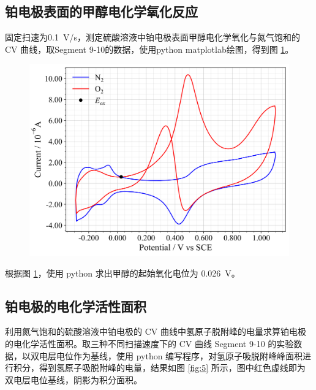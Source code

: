\subsection{铂电极表面的甲醇电化学氧化反应}

固定扫速为\SI{0.1}{V/s}，测定硫酸溶液中铂电极表面甲醇电化学氧化与氮气饱和的 CV 曲线，取Segment 9-10的数据，使用python matplotlab绘图，得到图 \ref{fig:4}。

\begin{figure}[htbp]
    \centering
    \includegraphics[width=.75\textwidth]{figures2/4.png}
    \label{fig:4}
\end{figure}

根据图 \ref{fig:4}，使用 python 求出甲醇的起始氧化电位为 \SI{0.026}{V}。

\subsection{铂电极的电化学活性面积}

利用氮气饱和的硫酸溶液中铂电极的 $\mathrm{CV}$ 曲线中氢原子脱附峰的电量求算铂电极的电化学活性面积。取三种不同扫描速度下的 $\mathrm{CV}$ 曲线 Segment 9-10 的实验数据，以双电层电位作为基线，使用 python 编写程序，对氢原子吸脱附峰峰面积进行积分，得到氢原子吸脱附峰的电量，结果如图 \ref{fig:5} 所示，图中红色虚线即为双电层电位基线，阴影为积分面积。

